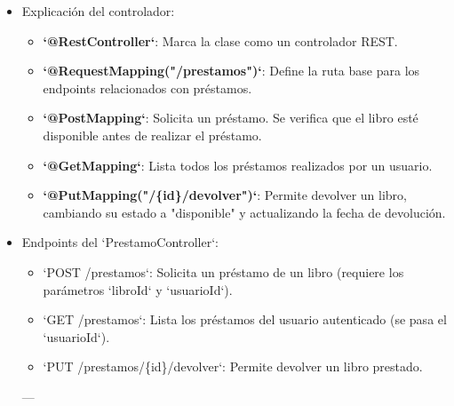 \documentclass[11pt]{article}
\begin{document}
\begin{itemize}
\begin{verbatim}
    // Listar los préstamos de un usuario
    @GetMapping
    public ResponseEntity<List<Prestamo>> listarPrestamosUsuario(@RequestParam("usuarioId") Long usuarioId) {
        return usuarioRepository.findById(usuarioId)
                .map(usuario -> ResponseEntity.ok(prestamoRepository.findByUsuarioId(usuarioId)))
                .orElse(ResponseEntity.notFound().build());
    }

    // Devolver un libro prestado
    @PutMapping("/{id}/devolver")
    public ResponseEntity<Void> devolverLibro(@PathVariable Long id) {
        return prestamoRepository.findById(id)
                .map(prestamo -> {
                    Libro libro = prestamo.getLibro();
                    libro.setEstado("disponible");
                    libroRepository.save(libro);
                    prestamo.setFechaDevolucion(LocalDate.now());
                    prestamoRepository.save(prestamo);
                    return ResponseEntity.noContent().build();
                })
                .orElse(ResponseEntity.notFound().build());
    }
}
\end{verbatim}

\item Explicación del controlador:
\label{sec:org93c443a}
\begin{itemize}
\item \textbf{\textbf{`@RestController`}}: Marca la clase como un controlador REST.
\item \textbf{\textbf{`@RequestMapping("/prestamos")`}}: Define la ruta base para los endpoints relacionados con préstamos.
\item \textbf{\textbf{`@PostMapping`}}: Solicita un préstamo. Se verifica que el libro esté disponible antes de realizar el préstamo.
\item \textbf{\textbf{`@GetMapping`}}: Lista todos los préstamos realizados por un usuario.
\item \textbf{\textbf{`@PutMapping("/\{id\}/devolver")`}}: Permite devolver un libro, cambiando su estado a "disponible" y actualizando la fecha de devolución.
\end{itemize}

\item Endpoints del `PrestamoController`:
\label{sec:orge3669e1}
\begin{itemize}
\item `POST /prestamos`: Solicita un préstamo de un libro (requiere los parámetros `libroId` y `usuarioId`).
\item `GET /prestamos`: Lista los préstamos del usuario autenticado (se pasa el `usuarioId`).
\item `PUT /prestamos/\{id\}/devolver`: Permite devolver un libro prestado.
\end{itemize}

---
\end{itemize}
\end{document}
